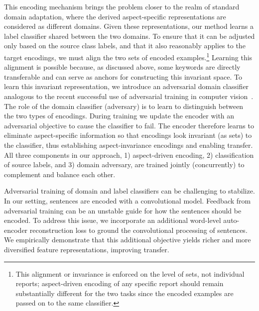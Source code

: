 This encoding mechanism brings the problem closer to the realm of standard domain adaptation, where the derived aspect-specific representations are considered as different domains. Given these representations, our method learns a label classifier shared between the two domains. To ensure that it can be adjusted only based on the source class labels, and that it also reasonably applies to the target encodings, we must align the two sets of encoded examples.\footnote{This alignment or invariance is enforced on the level of sets, not individual reports; aspect-driven encoding of any specific report should remain substantially different for the two tasks since the encoded examples are passed on to the same classifier.}  Learning this alignment is possible because, as discussed above, some keywords are directly transferable and can serve as anchors for constructing this invariant space. To learn this invariant representation, we introduce an adversarial domain classifier analogous to the recent successful use of adversarial training in computer vision~\cite{ganin2014unsupervised}. The role of the domain classifier (adversary) is to learn to distinguish between the two types of encodings. During training we update the encoder with an adversarial objective to cause the classifier to fail.  
The encoder therefore learns to eliminate aspect-specific information so that encodings look invariant (as sets) to the classifier, thus establishing aspect-invariance encodings and enabling transfer.
All three components in our approach, 1) aspect-driven encoding, 2) classification of source labels, and 3) domain adversary, are trained jointly (concurrently) to complement and balance each other.

Adversarial training of domain and label classifiers can be challenging to stabilize. In our setting, sentences are encoded with a convolutional model.
Feedback from adversarial training can be an unstable guide for how the sentences should be encoded.
To address this issue, we incorporate an additional word-level auto-encoder reconstruction loss to ground the convolutional processing of sentences. We empirically demonstrate that this additional objective yields richer and more diversified feature representations, improving transfer. 

